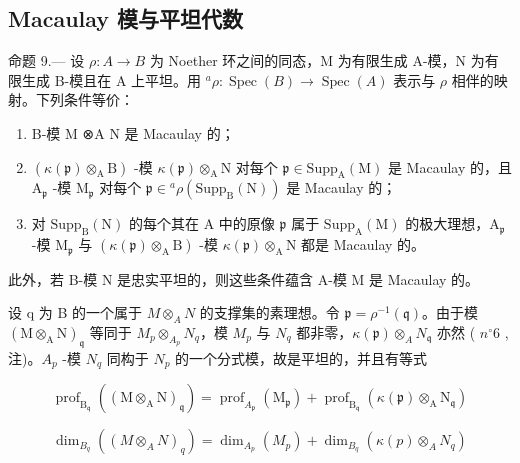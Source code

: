 \subsection{Macaulay 模与平坦代数}

命题 9.— 设 \(\rho: A \to B\) 为 Noether 环之间的同态，M 为有限生成 A-模，N 为有限生成 B-模且在 A 上平坦。用 \({}^{a}\rho: \operatorname{Spec}(B) \longrightarrow \operatorname{Spec}(A)\) 表示与 \(\rho\) 相伴的映射。下列条件等价：

\begin{enumerate}
\def\labelenumi{(\roman{enumi})}
\item
  B-模 M ⊗A N 是 Macaulay 的；
\item
  \((\kappa(\mathfrak{p})\otimes_{\mathrm{A}}\mathrm{B})\) -模 \(\kappa(\mathfrak{p})\otimes_{\mathrm{A}}\mathrm{N}\) 对每个 \(\mathfrak{p}\in\mathrm{Supp}_{\mathrm{A}}(\mathrm{M})\) 是 Macaulay 的，且 \(\mathrm{A}_{\mathfrak{p}}\) -模 \(\mathrm{M}_{\mathfrak{p}}\) 对每个 \(\mathfrak{p}\in{}^{a}\rho(\mathrm{Supp}_{\mathrm{B}}(\mathrm{N}))\) 是 Macaulay 的；
\item
  对 \(\mathrm{Supp}_{\mathrm{B}}(\mathrm{N})\) 的每个其在 A 中的原像 \(\mathfrak{p}\) 属于 \(\mathrm{Supp}_{\mathrm{A}}(\mathrm{M})\) 的极大理想，\(\mathrm{A}_{\mathfrak{p}}\) -模 \(\mathrm{M}_{\mathfrak{p}}\) 与 \((\kappa(\mathfrak{p}) \otimes_{\mathrm{A}} \mathrm{B})\) -模 \(\kappa(\mathfrak{p}) \otimes_{\mathrm{A}} \mathrm{N}\) 都是 Macaulay 的。
\end{enumerate}

此外，若 B-模 N 是忠实平坦的，则这些条件蕴含 A-模 M 是 Macaulay 的。

设 q 为 B 的一个属于 \(M \otimes_{A} N\) 的支撑集的素理想。令 \(\mathfrak{p} = \rho^{-1}(\mathfrak{q})\)。由于模 \((\mathrm{M} \otimes_{\mathrm{A}} \mathrm{N})_{\mathfrak{q}}\) 等同于 \(M_{p} \otimes_{A_{p}} N_{q}\)，模 \(M_{p}\) 与 \(N_{q}\) 都非零，\(\kappa(\mathfrak{p}) \otimes_{A} N_{\mathfrak{q}}\) 亦然 ( \(n^{\circ} 6\) , 注)。\(A_{p}\) -模 \(N_{q}\) 同构于 \(N_{p}\) 的一个分式模，故是平坦的，并且有等式

\[
\operatorname{prof} _ {\mathrm{B} _ {\mathfrak {q}}} \left(\left(\mathrm{M} \otimes_ {\mathrm{A}} \mathrm{N}\right) _ {\mathfrak {q}}\right) = \operatorname{prof} _ {A_ {\mathfrak {p}}} \left(\mathrm{M} _ {\mathfrak {p}}\right) + \operatorname{prof} _ {\mathrm{B} _ {\mathfrak {q}}} (\kappa (\mathfrak {p}) \otimes_ {\mathrm{A}} \mathrm{N} _ {\mathfrak {q}})
\]

\[
\dim_ {B _ {q}} \left(\left(M \otimes_ {A} N\right) _ {q}\right) = \dim_ {A _ {p}} \left(M _ {p}\right) + \dim_ {B _ {q}} \left(\kappa (p) \otimes_ {A} N _ {q}\right)
\]

